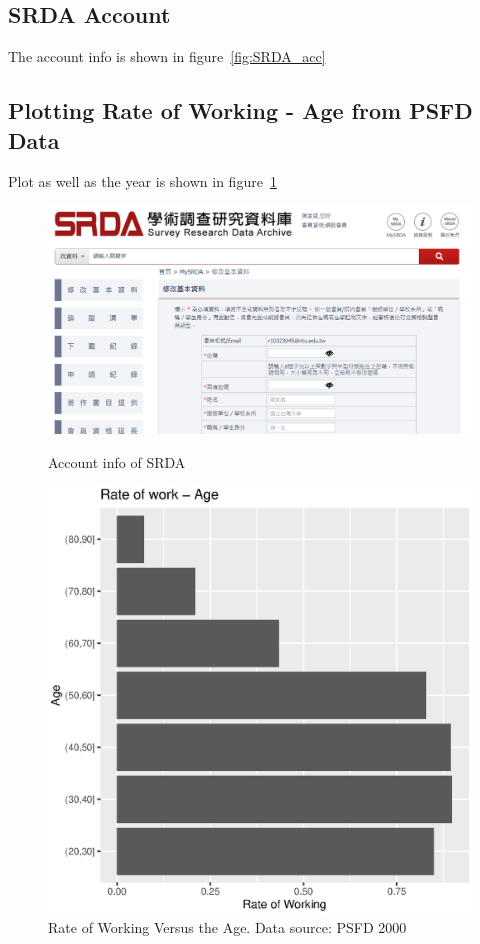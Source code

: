\subsection{SRDA Account}

The account info is shown in figure~\ref{fig:SRDA_acc}


\subsection{Plotting Rate of Working - Age from PSFD Data}

Plot as well as the year is shown in figure~\ref{fig:PSFD}



\begin{figure}
    \centering
    \begin{minipage}[t]{.5\textwidth}
        \centering
        \includegraphics[width = \linewidth]{image/SRDA.png}
        \caption{Account info of SRDA}
        \label{fig:SRDA_acc}
    \end{minipage}%
    \begin{minipage}[t]{.5\textwidth}
        \centering
        \includegraphics[width = 0.8\linewidth]{src/SRDA/Result/Work_age.eps}
        \caption{Rate of Working Versus the Age. Data source: PSFD 2000}
        \label{fig:PSFD}
    \end{minipage}
\end{figure}